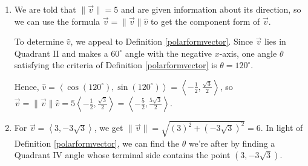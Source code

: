 \documentclass{ximera}
\begin{document}
\begin{example}
\begin{explanation}
\begin{enumerate}
\item  We are told that $\| \overrightarrow{v} \| = 5$ and are given information about its direction, so we can use the formula $\overrightarrow{v} = \| \overrightarrow{v} \| \hat{v}$ to get the component form of $\overrightarrow{v}$. 

 

 To determine $\hat{v}$, we appeal to Definition \ref{polarformvector}.  Since $\overrightarrow{v}$ lies in Quadrant II and makes a  $60^{\circ}$ angle with the negative $x$-axis, one angle $\theta$ satisfying the criteria of  Definition \ref{polarformvector} is $\theta = 120^{\circ}$.  
 

\begin{center}
\end{center}

Hence,  $\hat{v} = \left< \cos\left(120^{\circ}\right), \sin\left(120^{\circ}\right) \right> = \left< - \frac{1}{2} , \frac{\sqrt{3}}{2} \right>$, so  $\overrightarrow{v} = \| \overrightarrow{v} \| \hat{v} = 5  \left< - \frac{1}{2} , \frac{\sqrt{3}}{2} \right> =  \left< - \frac{5}{2} , \frac{5\sqrt{3}}{2} \right>$.


\item  For $\overrightarrow{v} =  \left<3, -3\sqrt{3}\right>$, we get $\| \overrightarrow{v} \| = \sqrt{(3)^2+(-3\sqrt{3})^2} = 6$.  In light of Definition \ref{polarformvector}, we can find the $\theta$ we're after by finding a Quadrant IV angle whose terminal side contains the point  $(3, -3\sqrt{3})$.  


\end{enumerate}
\end{explanation}
\end{example}
\end{document}
